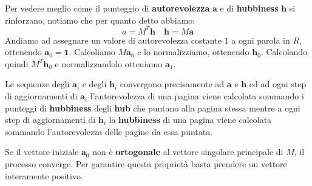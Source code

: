 \documentclass[\main/main.tex]{subfiles}
\begin{document}
\begin{multicols}{2}
\begin{observation}
\end{observation}
\begin{analysis}
    Per vedere meglio come il punteggio di \textbf{autorevolezza} \(\bm{a}\) e di \textbf{hubbiness} \(\bm{h}\) si rinforzano, notiamo che per quanto detto abbiamo:
    \[
        a=M^{T} \boldsymbol{h} \quad \boldsymbol{h}=M \boldsymbol{a}
    \]
    Andiamo ad assegnare un valore di autorevolezza costante \(1\) a ogni parola in \(R\), ottenendo \(\bm{a}_0 = \bm{1}\). Calcoliamo \(M \bm{a}_0\) e lo normalizziamo, ottenendo \(\bm{h}_0\). Calcolando quindi \(M^T \bm{h}_0\) e normalizzandolo otteniamo \(\bm{a}_1\).
    
    Le sequenze degli \(\bm{a}_i\) e degli \(\bm{h}_i\) convergono precisamente ad \(\bm{a}\) e \(\bm{h}\) ed ad ogni step di aggiornamenti di \(\bm{a}_i\) l'autorevolezza di una pagina viene calcolata sommando i punteggi di \textbf{hubbiness} degli \textbf{hub} che puntano alla pagina stessa mentre a ogni step di aggiornamenti di \(\bm{h}_i\) la \textbf{hubbiness} di una pagina viene calcolata sommando l'autorevolezza delle pagine da essa puntata.
    
    Se il vettore iniziale \(\bm{a}_0\) non è \textbf{ortogonale} al vettore singolare principale di \(M\), il processo converge. Per garantire questa proprietà basta prendere un vettore interamente positivo.
\end{analysis}
\end{multicols}
\end{document}
